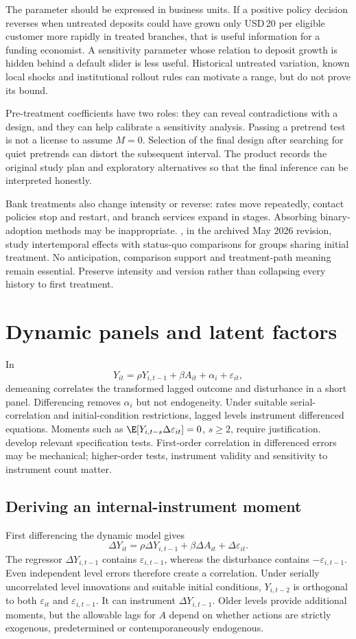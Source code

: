 The parameter should be expressed in business units. If a positive policy
decision reverses when untreated deposits could have grown only USD\,20
per eligible customer more rapidly in treated branches, that is useful
information for a funding economist. A sensitivity parameter whose
relation to deposit growth is hidden behind a default slider is less
useful. Historical untreated variation, known local shocks and institutional
rollout rules can motivate a range, but do not prove its bound.

Pre-treatment coefficients have two roles: they can reveal contradictions
with a design, and they can help calibrate a sensitivity analysis. Passing
a pretrend test is not a license to assume $M=0$. Selection of the final
design after searching for quiet pretrends can distort the subsequent
interval. The product records the original study plan and exploratory
alternatives so that the final inference can be interpreted honestly.

Bank treatments also change intensity or reverse: rates move repeatedly,
contact policies stop and restart, and branch services expand in stages.
Absorbing binary-adoption methods may be inappropriate.
\citet{dechaisemartin2024}, in the archived May 2026 revision, study
intertemporal effects with status-quo comparisons for groups sharing initial
treatment. No anticipation, comparison support and treatment-path meaning
remain essential. Preserve intensity and version rather than collapsing
every history to first treatment.

\section{Dynamic panels and latent factors}
In
\[
 Y_{it}=\rho Y_{i,t-1}+\beta A_{it}+\alpha_i+\varepsilon_{it},
\]
demeaning correlates the transformed lagged outcome and disturbance in a
short panel. Differencing removes $\alpha_i$ but not endogeneity. Under
suitable serial-correlation and initial-condition restrictions, lagged
levels instrument differenced equations. Moments such as
$\E[Y_{i,t-s}\Delta\varepsilon_{it}]=0$, $s\geq2$, require justification.
\citet{arellano1991} develop relevant specification tests. First-order
correlation in differenced errors may be mechanical; higher-order tests,
instrument validity and sensitivity to instrument count matter.

\subsection{Deriving an internal-instrument moment}
First differencing the dynamic model gives
\[
 \Delta Y_{it}=\rho\Delta Y_{i,t-1}+\beta\Delta A_{it}
              +\Delta\varepsilon_{it}.
\]
The regressor $\Delta Y_{i,t-1}$ contains $\varepsilon_{i,t-1}$,
whereas the disturbance contains $-\varepsilon_{i,t-1}$.
Even independent level errors therefore create a correlation. Under serially
uncorrelated level innovations and suitable initial conditions, $Y_{i,t-2}$
is orthogonal to both $\varepsilon_{it}$ and $\varepsilon_{i,t-1}$.
It can instrument $\Delta Y_{i,t-1}$. Older levels provide additional
moments, but the allowable lags for $A$ depend on whether actions are
strictly exogenous, predetermined or contemporaneously endogenous.


